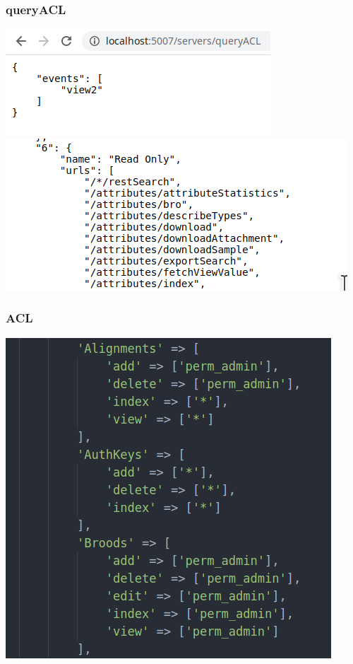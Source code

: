 \begin{frame}
  \frametitle{queryACL}
  \begin{center}
    \includegraphics[scale=0.5]{queryACL.png}
    \includegraphics[scale=0.5]{queryACLPrint.png}
  \end{center}
\end{frame}

\begin{frame}
  \frametitle{ACL}
  \begin{center}
    \includegraphics[scale=0.5]{ACLList.png}
  \end{center}
\end{frame}


